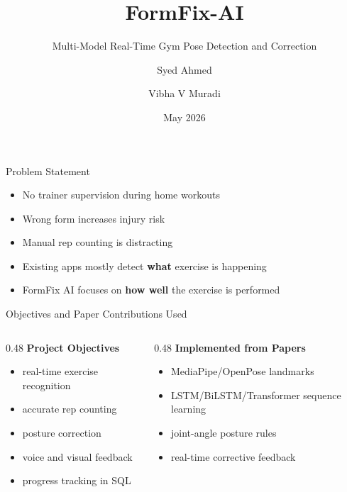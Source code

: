 \documentclass[aspectratio=169]{beamer}
\title{FormFix-AI}
\subtitle{Multi-Model Real-Time Gym Pose Detection and Correction}
\author{Syed Ahmed \and Vibha V Muradi}
\institute{UVCE Mini Project Presentation}
\date{May 2026}
\begin{document}
\begin{frame}
  \titlepage
\end{frame}

\begin{frame}{Problem Statement}
\begin{itemize}
  \item No trainer supervision during home workouts
  \item Wrong form increases injury risk
  \item Manual rep counting is distracting
  \item Existing apps mostly detect \textbf{what} exercise is happening
  \item FormFix AI focuses on \textbf{how well} the exercise is performed
\end{itemize}
\end{frame}

\begin{frame}{Objectives and Paper Contributions Used}
\small
\begin{columns}[T]
\begin{column}{0.48\textwidth}
\textbf{Project Objectives}
\begin{itemize}
  \item real-time exercise recognition
  \item accurate rep counting
  \item posture correction
  \item voice and visual feedback
  \item progress tracking in SQL
\end{itemize}
\end{column}
\begin{column}{0.48\textwidth}
\textbf{Implemented from Papers}
\begin{itemize}
  \item MediaPipe/OpenPose landmarks
  \item LSTM/BiLSTM/Transformer sequence learning
  \item joint-angle posture rules
  \item real-time corrective feedback
\end{itemize}
\end{column}
\end{columns}
\end{frame}
\end{document}
